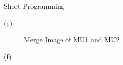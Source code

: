 \documentclass[a4paper,12pt]{article}
\begin{document}
\begin{section}{Short Programming}
\begin{subsection}{(e)}
\begin{figure}[!htb]
        \caption{Merge Image of MU1 and MU2}
      \end{figure}
      


\end{subsection}
\clearpage
\begin{subsection}{(f)}


\end{subsection}

\end{section}
\end{document}
